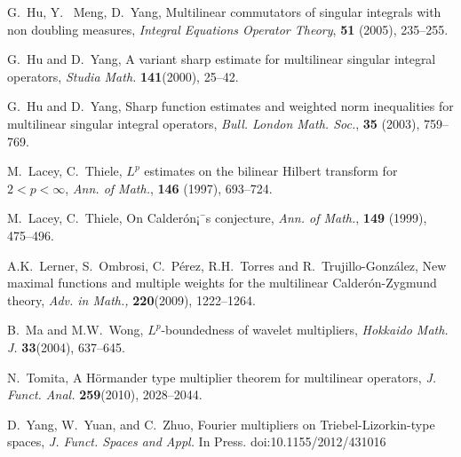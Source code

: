 \documentclass[11pt,oneside,onecolumn]{amsart}
\numberwithin{equation}{section}
\begin{document}
\begin{thebibliography}{EEE}
G.~Hu,  Y.~ Meng, D.~Yang,  Multilinear commutators of singular integrals with non doubling measures,
\textit{Integral Equations Operator Theory},
\textbf{51} (2005),  235--255.

G.~Hu and D.~Yang,
A variant sharp estimate for multilinear singular integral operators,
\textit{Studia Math.}
\textbf{141}(2000), 25--42.

G.~Hu and D.~Yang,
Sharp function estimates and weighted norm inequalities for multilinear singular integral operators,
\textit{Bull. London Math. Soc.},
\textbf{35} (2003),  759--769.

M.~Lacey, C.~Thiele,
$L^p$ estimates on the bilinear Hilbert transform for $2<p<\infty$,
\textit{Ann. of Math.},
\textbf{146} (1997),
693--724.

M.~Lacey, C.~Thiele,
On Calder\'on¡¯s conjecture,
\textit{Ann. of Math.},
\textbf{149} (1999),
475--496.

A.K.~Lerner, S.~Ombrosi, C.~P\'{e}rez, R.H.~Torres and R.~Trujillo-Gonz\'{a}lez, New
maximal functions and multiple weights for the multilinear Calder\'{o}n-Zygmund
theory,
\textit{ Adv. in Math.,}
 \textbf{220}(2009), 1222--1264.

B.~Ma and M.W.~Wong,
$L^p$-boundedness of wavelet multipliers,
\textit{Hokkaido Math. J.}
\textbf{33}(2004), 637--645.

N.~Tomita,
A H\"{o}rmander type multiplier theorem for multilinear operators,
\textit{J. Funct. Anal.}
\textbf{259}(2010), 2028--2044.

D.~Yang, W.~Yuan, and C.~Zhuo,
Fourier multipliers on Triebel-Lizorkin-type spaces,
\textit{J. Funct. Spaces and Appl.}
In Press. doi:10.1155/2012/431016
\end{thebibliography}
\end{document}
